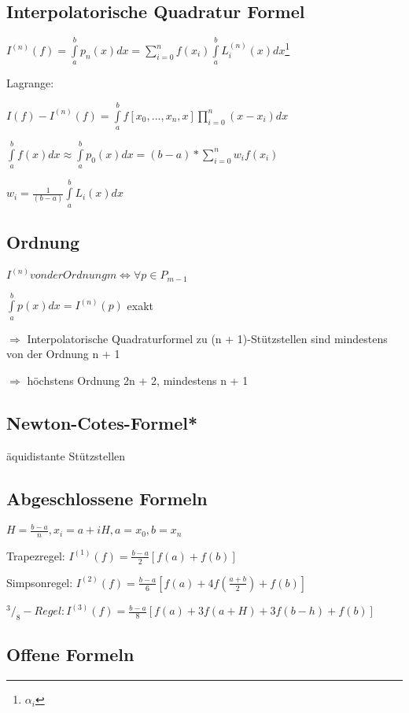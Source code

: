 \documentclass[12pt,a4paper]{article} %
\newcommand*\tab[1][1cm]{\hspace*{#1}}
\newcommand*\rfrac[2]{{}^{#1}\!/_{#2}} %
\begin{document}
	\subsection{Interpolatorische Quadratur Formel}
	
	$I^{(n)}(f) = \int\limits_{a}^{b}p_n(x)dx = \sum\limits_{i = 0}^nf(x_i)\int\limits_a^bL_i^{(n)}(x)dx$\footnote{$\alpha_i$}
	
	Lagrange:
	
	$I(f) - I^{(n)}(f) = \int\limits_a^bf[x_0, ..., x_n, x] \prod\limits_{i = 0}^n(x - x_i)dx$
	
	$\int\limits_a^bf(x)dx \approx \int\limits_a^bp_0(x)dx = (b - a) * \sum\limits_{i = 0}^nw_if(x_i)$
	
	$w_i = \frac{1}{(b - a)} \int\limits_a^bL_i(x)dx$
	
	\subsection{Ordnung}
	
	$I^{(n)}von der Ordnung m \Leftrightarrow \forall p \in P_{m - 1}$
	
	$\int\limits_a^bp(x)dx = I^{(n)}(p)$ \tab exakt
	
	$\Rightarrow$ Interpolatorische Quadraturformel zu (n + 1)-Stützstellen sind mindestens von der Ordnung n + 1
	
	$\Rightarrow$ höchstens Ordnung 2n + 2, mindestens n + 1
	
	\subsection{Newton-Cotes-Formel*}
	
	äquidistante Stützstellen
	
	\subsection{Abgeschlossene Formeln}
	
	$H = \frac{b - a}{n}, x_i = a + iH, a = x_0, b = x_n$
	
	Trapezregel: $I^{(1)}(f) = \frac{b - a}{2}[f(a) + f(b)]$
	
	Simpsonregel: $I^{(2)}(f) = \frac{b - a}{6}[f(a) + 4f(\frac{a + b}{2}) + f(b)]$
	
	$\rfrac{3}{8}-Regel: I^{(3)}(f) = \frac{b - a}{8}[f(a) + 3f(a + H) + 3f(b - h) + f(b)]$
	
	\subsection{Offene Formeln}
	
\end{document}
